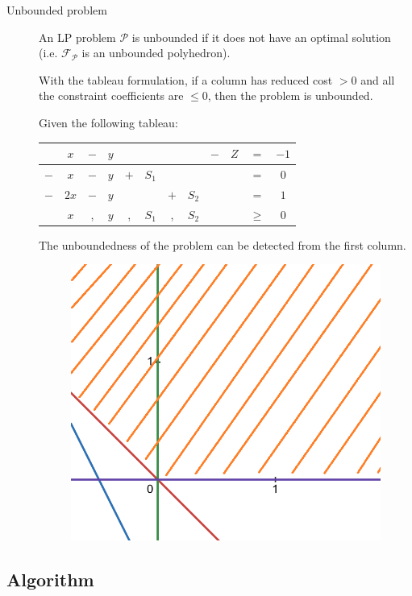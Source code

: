 \begin{description}
    \item[Unbounded problem]  
        An LP problem $\mathcal{P}$ is unbounded if it does not have an optimal solution (i.e. $\mathcal{F}_\mathcal{P}$ is an unbounded polyhedron).

        With the tableau formulation, if a column has reduced cost $> 0$ and all the constraint coefficients are $\leq 0$, then the problem is unbounded.

        \begin{example}
            Given the following tableau:
            \begin{center}
                \begin{tabular}{cccccccccccc}
                    \toprule
                    & $x$ & $-$ & $y$ & & & & & $-$ & $Z$ & $=$ & $-1$ \\
                    \midrule
                    $-$ & $x$ & $-$ & $y$ & $+$ & $S_1$ & & & & & $=$ & $0$ \\
                    $-$ & $2x$ & $-$ & $y$ & & & $+$ & $S_2$ & & & $=$ & $1$ \\
                    \midrule
                    & $x$ & , & $y$ & , & $S_1$ & , & $S_2$ & & & $\geq$ & 0 \\
                    \bottomrule
                \end{tabular}
            \end{center}
            The unboundedness of the problem can be detected from the first column.

            \begin{figure}[H]
                \centering
                \includegraphics[width=0.3\linewidth]{./img/lp_unbounded.png}
            \end{figure}
    \end{example}
\end{description}


\subsection{Algorithm}

